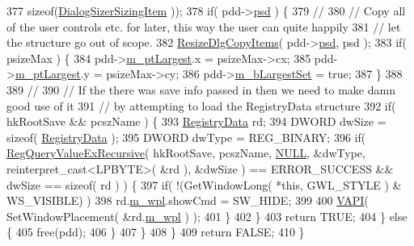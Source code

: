 \begin{DoxyCode}
377                \textcolor{keyword}{sizeof}(\mbox{\hyperlink{struct_dialog_sizer_sizing_item}{DialogSizerSizingItem}} ));
378       \textcolor{keywordflow}{if}( pdd->\mbox{\hyperlink{struct_dialog_data_aefb399f16dab34e6a2da67716d6147fc}{psd}} ) \{
379         \textcolor{comment}{//}
380         \textcolor{comment}{//      Copy all of the user controls etc. for later, this way the user can quite happily}
381         \textcolor{comment}{//      let the structure go out of scope.}
382         \mbox{\hyperlink{_resize_dlg_8cpp_ad4ba4376f50f357ac88b0fd3bfeb1a19}{ResizeDlgCopyItems}}( pdd->\mbox{\hyperlink{struct_dialog_data_aefb399f16dab34e6a2da67716d6147fc}{psd}}, psd );
383         \textcolor{keywordflow}{if}( psizeMax ) \{
384           pdd->\mbox{\hyperlink{struct_dialog_data_a577bccf59e71fb65969247d1f8275448}{m\_ptLargest}}.x = psizeMax->cx;
385           pdd->\mbox{\hyperlink{struct_dialog_data_a577bccf59e71fb65969247d1f8275448}{m\_ptLargest}}.y = psizeMax->cy;
386           pdd->\mbox{\hyperlink{struct_dialog_data_abffcfeeb5f8f9b1ecd84d9bdf7706b07}{m\_bLargestSet}} = \textcolor{keyword}{true};
387         \}
388         
389         \textcolor{comment}{//}
390         \textcolor{comment}{//      If the there was save info passed in then we need to make damn good use of it}
391         \textcolor{comment}{//      by attempting to load the RegistryData structure }
392         \textcolor{keywordflow}{if}( hkRootSave && pcszName ) \{
393           \mbox{\hyperlink{struct_registry_data}{RegistryData}} rd;
394           DWORD dwSize = \textcolor{keyword}{sizeof}( \mbox{\hyperlink{struct_registry_data}{RegistryData}} );
395           DWORD dwType = REG\_BINARY;
396           \textcolor{keywordflow}{if}( \mbox{\hyperlink{_resize_dlg_8cpp_a74702acf423eaa66851bd656c737b6ba}{RegQueryValueExRecursive}}( hkRootSave, pcszName, 
      \mbox{\hyperlink{getopt1_8c_a070d2ce7b6bb7e5c05602aa8c308d0c4}{NULL}}, &dwType, reinterpret\_cast<LPBYTE>( &rd ), &dwSize ) == ERROR\_SUCCESS && dwSize == \textcolor{keyword}{sizeof}( rd ) ) 
      \{
397             \textcolor{keywordflow}{if}( !(GetWindowLong( *\textcolor{keyword}{this}, GWL\_STYLE ) & WS\_VISIBLE) )
398               rd.\mbox{\hyperlink{struct_registry_data_a8635a0973196376667281ae2ae52e6be}{m\_wpl}}.showCmd = SW\_HIDE;
399             
400             \mbox{\hyperlink{_win_helper_8h_a5b2d2a39a00a17407c148a7392e32895}{VAPI}}( SetWindowPlacement( &rd.\mbox{\hyperlink{struct_registry_data_a8635a0973196376667281ae2ae52e6be}{m\_wpl}} ) );
401           \}
402         \}
403         \textcolor{keywordflow}{return} TRUE;
404       \} \textcolor{keywordflow}{else} \{
405         free(pdd);
406       \}
407     \}
408   \}
409   \textcolor{keywordflow}{return} FALSE;
410 \}
\end{DoxyCode}
